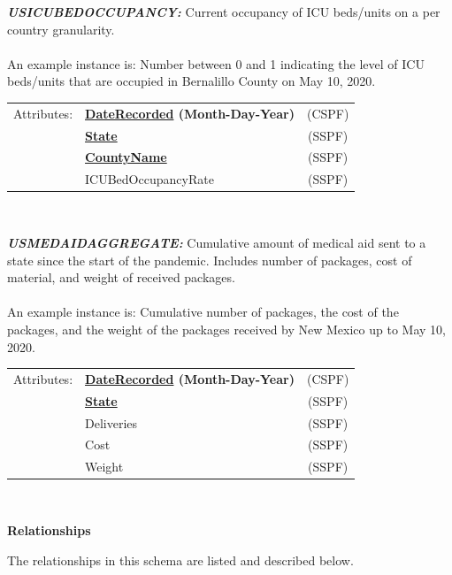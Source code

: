 \documentclass[11pt]{article}
\begin{document}
\begin{description}
\item{\em\bf USICUBEDOCCUPANCY:} Current occupancy of ICU beds/units on a per country granularity. \\ \\

An example instance is: Number between 0 and 1 indicating the level of ICU beds/units that are occupied in Bernalillo County on May 10, 2020. \\
 
\begin{tabular}{llc}
 Attributes: & {\bf \underline{DateRecorded} (Month-Day-Year)} &  (CSPF) \\
	    & {\bf \underline{State}} &  (SSPF) \\
	    & {\bf \underline{CountyName}} & (SSPF) \\
	    & ICUBedOccupancyRate & (SSPF) \\
\end{tabular} \\

\item{\em\bf USMEDAIDAGGREGATE:} Cumulative amount of medical aid sent to a state since the start of the pandemic. Includes number of packages, cost of material, and weight of received packages. \\ \\

An example instance is: Cumulative number of packages, the cost of the packages, and the weight of the packages received by New Mexico up to May 10, 2020. \\
 
\begin{tabular}{llc}
 Attributes: & {\bf \underline{DateRecorded} (Month-Day-Year)} &  (CSPF) \\
	    & {\bf \underline{State}} &  (SSPF) \\
	    & Deliveries & (SSPF) \\
	    & Cost & (SSPF) \\
	    & Weight & (SSPF) \\
\end{tabular} \\
\end{description}
\pagebreak

\noindent
\textbf{Relationships}

\noindent
The relationships in this schema are listed and described below. \\
\end{document}
